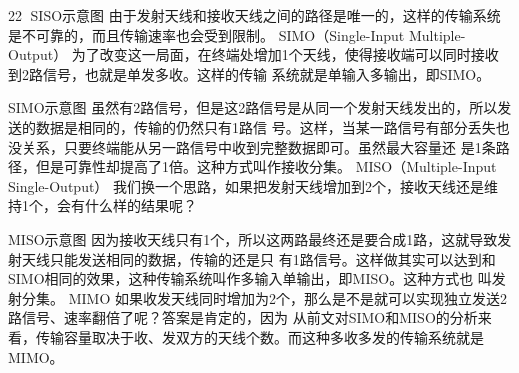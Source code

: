                                                                      22
SISO示意图
由于发射天线和接收天线之间的路径是唯一的，这样的传输系统是不可靠的，而且传输速率也会受到限制。
SIMO（Single-Input Multiple-Output）
为了改变这一局面，在终端处增加1个天线，使得接收端可以同时接收到2路信号，也就是单发多收。这样的传输
系统就是单输入多输出，即SIMO。




SIMO示意图
虽然有2路信号，但是这2路信号是从同一个发射天线发出的，所以发送的数据是相同的，传输的仍然只有1路信
号。这样，当某一路信号有部分丢失也没关系，只要终端能从另一路信号中收到完整数据即可。虽然最大容量还
是1条路径，但是可靠性却提高了1倍。这种方式叫作接收分集。
MISO（Multiple-Input Single-Output）
我们换一个思路，如果把发射天线增加到2个，接收天线还是维持1个，会有什么样的结果呢？




MISO示意图
因为接收天线只有1个，所以这两路最终还是要合成1路，这就导致发射天线只能发送相同的数据，传输的还是只
有1路信号。这样做其实可以达到和SIMO相同的效果，这种传输系统叫作多输入单输出，即MISO。这种方式也
叫发射分集。
MIMO
如果收发天线同时增加为2个，那么是不是就可以实现独立发送2路信号、速率翻倍了呢？答案是肯定的，因为
从前文对SIMO和MISO的分析来看，传输容量取决于收、发双方的天线个数。而这种多收多发的传输系统就是
MIMO。

